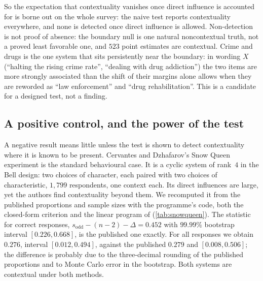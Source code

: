 \documentclass[11pt]{article}
\theoremstyle{definition}
\theoremstyle{remark}
\begin{document}
So the expectation that contextuality vanishes once direct influence is accounted for is borne out on the whole survey: the naive
test reports contextuality everywhere, and none is detected once direct influence is allowed. Non-detection is not proof of absence: the
boundary null is one natural noncontextual truth, not a proved least favorable one, and $523$ point estimates are contextual. Crime and drugs is the one system that sits persistently near the
boundary: in wording $X$ (``halting the rising crime rate'', ``dealing with drug addiction'') the two items are more strongly associated
than the shift of their margins alone allows when they are reworded as ``law enforcement'' and ``drug rehabilitation''. This is a
candidate for a designed test, not a finding.

\subsection{A positive control, and the power of the test}\label{sec:positive}

A negative result means little unless the test is shown to detect contextuality where it is known to be present. Cervantes and
Dzhafarov's Snow Queen experiment \cite{CervantesDzhafarov2018} is the standard behavioural case. It is a cyclic system of rank~$4$ in the
Bell design: two choices of character, each paired with two choices of characteristic, $1{,}799$ respondents, one context each. Its
direct influences are large, yet the authors find contextuality beyond them. We recomputed it from the published proportions and sample
sizes with the programme's code, both the closed-form criterion and the linear program of \cite[\S4]{Bridges}
(\cref{tab:snowqueen}). The statistic for correct responses, $s_{\mathrm{odd}}-(n-2)-\Delta=0.452$ with $99.99\%$ bootstrap interval
$[0.226,0.668]$, is the published one exactly. For all responses we obtain $0.276$, interval $[0.012,0.494]$, against the published
$0.279$ and $[0.008,0.506]$; the difference is probably due to the three-decimal rounding of the published proportions and to Monte Carlo
error in the bootstrap. Both systems are contextual under both methods.
\end{document}
